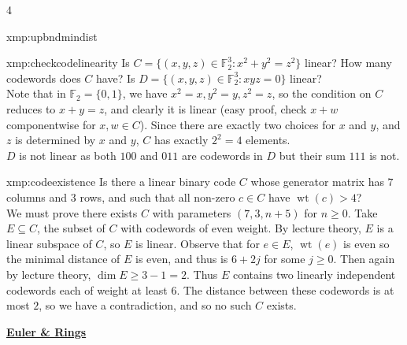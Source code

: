 \documentclass[landscape, 8pt]{extarticle}
\DeclareMathOperator{\wt}{wt}
\begin{document}
\begin{multicols*}{4}
\begin{xmp}{xmp:upbndmindist}{ }
		\end{xmp}
		
		
		\begin{xmp}{xmp:checkcodelinearity}{ }
		Is $C = \{(x, y, z)\in \mathbb{F}_2^3 : x^2 + y^2 = z^2\}$ linear? How many codewords does $C$ have? Is $D = \{(x, y, z)\in \mathbb{F}_2^3:xyz = 0\}$ linear?\\
		Note that in $\mathbb{F}_2 = \{0, 1\}$, we have $x^2 = x, y^2 = y, z^2 = z$, so the condition on $C$ reduces to $x + y = z$, and clearly it is linear (easy proof, check $x + w$ componentwise for $x, w\in C$). Since there are exactly two choices for $x$ and $y$, and $z$ is determined by $x$ and $y$, $C$ has exactly $2^2 = 4$ elements.\\
		$D$ is not linear as both $100$ and $011$ are codewords in $D$ but their sum $111$ is not.
		
		\end{xmp}
		
		
		\begin{xmp}{xmp:codeexistence}{ }
		Is there a linear binary code $C$ whose generator matrix has $7$ columns and $3$ rows, and such that all non-zero $c\in C$ have $\wt(c) > 4$?\\
		We must prove there exists $C$ with parameters $(7, 3, n+5)$ for $n \ge 0$. Take $E \subseteq C$, the subset of $C$ with codewords of even weight. By lecture theory, $E$ is a linear subspace of $C$, so $E$ is linear. Observe that for $e\in E$, $\wt(e)$ is even so the minimal distance of $E$ is even, and thus is $6 + 2j$ for some $j \ge 0$. Then again by lecture theory, $\dim E \ge 3-1 = 2$. Thus $E$ contains two linearly independent codewords each of weight at least $6$. The distance between these codewords is at most $2$, so we have a contradiction, and so no such $C$ exists.
		
		\end{xmp}
		
		
	\columnbreak
	
	
	{\footnotesize \textbf{\underline{Euler \& Rings}}}
		
		
		

\end{multicols*}
\end{document}
